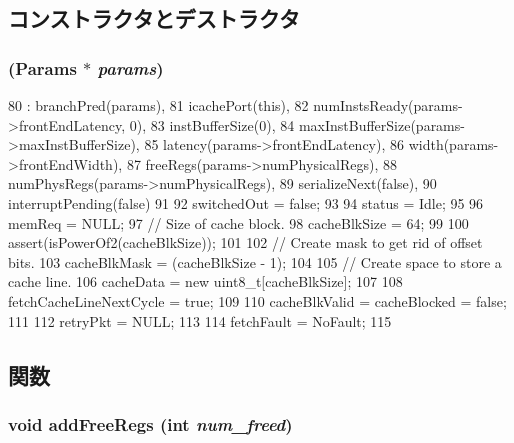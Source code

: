 \subsection{コンストラクタとデストラクタ}
\hypertarget{classFrontEnd_a207b33a1b071e34c89c0af0c3d4ae9ae}{
\subsubsection[{FrontEnd}]{ ({\bf Params} $\ast$ {\em params})}}
\label{classFrontEnd_a207b33a1b071e34c89c0af0c3d4ae9ae}



\begin{DoxyCode}
80     : branchPred(params),
81       icachePort(this),
82       numInstsReady(params->frontEndLatency, 0),
83       instBufferSize(0),
84       maxInstBufferSize(params->maxInstBufferSize),
85       latency(params->frontEndLatency),
86       width(params->frontEndWidth),
87       freeRegs(params->numPhysicalRegs),
88       numPhysRegs(params->numPhysicalRegs),
89       serializeNext(false),
90       interruptPending(false)
91 {
92     switchedOut = false;
93 
94     status = Idle;
95 
96     memReq = NULL;
97     // Size of cache block.
98     cacheBlkSize = 64;
99 
100     assert(isPowerOf2(cacheBlkSize));
101 
102     // Create mask to get rid of offset bits.
103     cacheBlkMask = (cacheBlkSize - 1);
104 
105     // Create space to store a cache line.
106     cacheData = new uint8_t[cacheBlkSize];
107 
108     fetchCacheLineNextCycle = true;
109 
110     cacheBlkValid = cacheBlocked = false;
111 
112     retryPkt = NULL;
113 
114     fetchFault = NoFault;
115 }
\end{DoxyCode}


\subsection{関数}
\hypertarget{classFrontEnd_a5562c5f14a79f595934df368f2e86d54}{
\subsubsection[{addFreeRegs}]{\setlength{\rightskip}{0pt plus 5cm}void addFreeRegs (int {\em num\_\-freed})}}
\label{classFrontEnd_a5562c5f14a79f595934df368f2e86d54}



